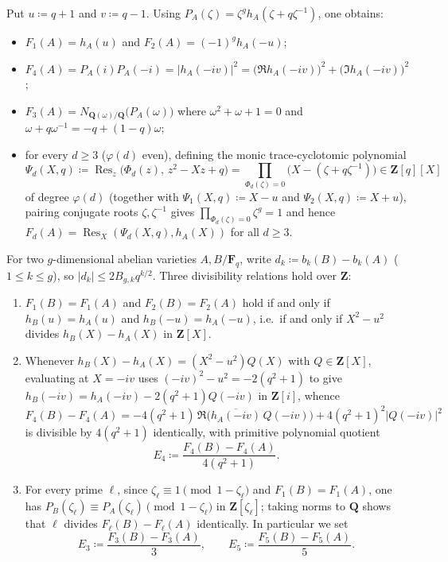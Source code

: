 \documentclass[11pt]{amsart}
\theoremstyle{remark}
\newcommand{\F}{\mathbf{F}}
\newcommand{\Z}{\mathbf{Z}}
\newcommand{\Q}{\mathbf{Q}}
\DeclareMathOperator{\Res}{Res}
\begin{document}
Put $u \coloneqq q + 1$ and $v \coloneqq q - 1$. Using $P_A(\zeta) = \zeta^g h_A(\zeta + q\zeta^{-1})$, one obtains:
\begin{itemize}
\item $F_1(A) = h_A(u)$ and $F_2(A) = (-1)^g h_A(-u)$;
\item $F_4(A) = P_A(i) P_A(-i) = |h_A(-i v)|^2 = \bigl(\Re h_A(-i v)\bigr)^2 + \bigl(\Im h_A(-i v)\bigr)^2$;
\item $F_3(A) = N_{\Q(\omega)/\Q}\bigl(P_A(\omega)\bigr)$ where $\omega^2 + \omega + 1 = 0$ and $\omega + q\omega^{-1} = -q + (1 - q)\omega$;
\item for every $d \ge 3$ ($\varphi(d)$ even), defining the monic trace-cyclotomic polynomial
\begin{equation}\label{eq:Psi-d}
\Psi_d(X, q) \coloneqq \Res_z\bigl(\Phi_d(z),\, z^2 - X z + q\bigr) = \prod_{\Phi_d(\zeta) = 0} \bigl(X - (\zeta + q\zeta^{-1})\bigr) \in \Z[q][X]
\end{equation}
of degree $\varphi(d)$ (together with $\Psi_1(X, q) \coloneqq X - u$ and $\Psi_2(X, q) \coloneqq X + u$), pairing conjugate roots $\zeta, \zeta^{-1}$ gives $\prod_{\Phi_d(\zeta)=0} \zeta^g = 1$ and hence $F_d(A) = \Res_X(\Psi_d(X, q), h_A(X))$ for all $d \ge 3$.
\end{itemize}

For two $g$-dimensional abelian varieties $A, B / \F_q$, write $d_k \coloneqq b_k(B) - b_k(A)$ ($1 \le k \le g$), so $|d_k| \le 2 B_{g,k} q^{k/2}$. Three divisibility relations hold over $\Z$:
\begin{enumerate}
\item $F_1(B) = F_1(A)$ and $F_2(B) = F_2(A)$ hold if and only if $h_B(u) = h_A(u)$ and $h_B(-u) = h_A(-u)$, i.e.\ if and only if $X^2 - u^2$ divides $h_B(X) - h_A(X)$ in $\Z[X]$.
\item Whenever $h_B(X) - h_A(X) = (X^2 - u^2) Q(X)$ with $Q \in \Z[X]$, evaluating at $X = -i v$ uses $(-i v)^2 - u^2 = -2(q^2 + 1)$ to give $h_B(-i v) = h_A(-i v) - 2(q^2 + 1) Q(-i v)$ in $\Z[i]$, whence
\[
F_4(B) - F_4(A) = -4(q^2 + 1)\,\Re\bigl(\overline{h_A(-i v)}\, Q(-i v)\bigr) + 4(q^2 + 1)^2 |Q(-i v)|^2
\]
is divisible by $4(q^2 + 1)$ identically, with primitive polynomial quotient
\[
E_4 \coloneqq \frac{F_4(B) - F_4(A)}{4(q^2 + 1)}.
\]
\item For every prime $\ell$, since $\zeta_\ell \equiv 1 \pmod{1 - \zeta_\ell}$ and $F_1(B) = F_1(A)$, one has $P_B(\zeta_\ell) \equiv P_A(\zeta_\ell) \pmod{1 - \zeta_\ell}$ in $\Z[\zeta_\ell]$; taking norms to $\Q$ shows that $\ell$ divides $F_\ell(B) - F_\ell(A)$ identically. In particular we set
\[
E_3 \coloneqq \frac{F_3(B) - F_3(A)}{3}, \qquad E_5 \coloneqq \frac{F_5(B) - F_5(A)}{5}.
\]
\end{enumerate}
\end{document}
